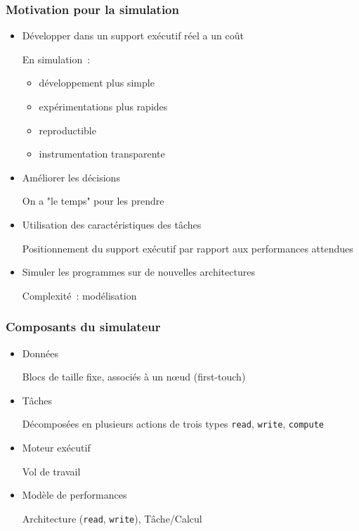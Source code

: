 \documentclass[xcolor={usenames,dvipsnames,svgnames,table}, aspectratio=43]{beamer}
\renewcommand{\emph}[1]{{\usebeamercolor[fg]{titlelike}#1}}
\begin{document}
\begin{frame}[fragile]
  \frametitle{Motivation pour la simulation}

  \begin{itemize}
    \item Développer dans un support exécutif réel a un coût

      En simulation~:
      \begin{itemize}
	\item développement plus simple
	\item expérimentations plus rapides
	\item reproductible
	\item instrumentation transparente
      \end{itemize}

    \item Améliorer les décisions

      On a "le temps" pour les prendre

    \item Utilisation des caractéristiques des tâches

      Positionnement du support exécutif par rapport aux performances attendues

    \item Simuler les programmes sur de nouvelles architectures

      Complexité~: modélisation
  \end{itemize}


\end{frame}

\begin{frame}[fragile]
  \frametitle{Composants du simulateur}
  \begin{itemize}
    \item Données

      Blocs de taille fixe, associés à un nœud (\emph{first-touch})

    \item Tâches

      Décomposées en plusieurs actions de trois types \verb/read/, \verb/write/, \verb/compute/

    \item Moteur exécutif

      Vol de travail

    \item Modèle de performances

      Architecture (\verb/read/, \verb/write/), Tâche/Calcul
  \end{itemize}

\end{frame}
\end{document}
